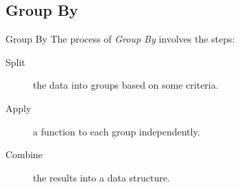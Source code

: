 \documentclass[final, 9pt, svgnames]{beamerPerdy}
\begin{document}
  \subsection{Group By}
  \begin{frame}{Group By}
		The process of \emph{Group By} involves the steps:
		\begin{description}
			\item[Split] the data into groups based on some criteria.
			\item[Apply] a function to each group independently.
			\item[Combine] the results into a data structure.
		\end{description}
  \end{frame}
\end{document}

